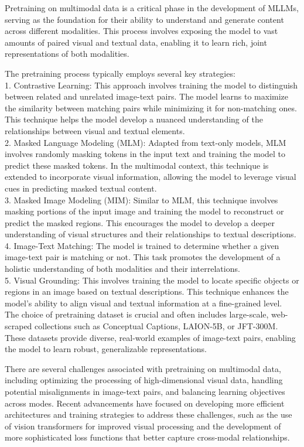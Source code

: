 Pretraining on multimodal data is a critical phase in the development of MLLMs, serving as the foundation for their ability to understand and generate content across different modalities. This process involves exposing the model to vast amounts of paired visual and textual data, enabling it to learn rich, joint representations of both modalities.

The pretraining process typically employs several key strategies:
\\
1. Contrastive Learning: This approach involves training the model to distinguish between related and unrelated image-text pairs. The model learns to maximize the similarity between matching pairs while minimizing it for non-matching ones. This technique helps the model develop a nuanced understanding of the relationships between visual and textual elements.
\\
2. Masked Language Modeling (MLM): Adapted from text-only models, MLM involves randomly masking tokens in the input text and training the model to predict these masked tokens. In the multimodal context, this technique is extended to incorporate visual information, allowing the model to leverage visual cues in predicting masked textual content.
\\
3. Masked Image Modeling (MIM): Similar to MLM, this technique involves masking portions of the input image and training the model to reconstruct or predict the masked regions. This encourages the model to develop a deeper understanding of visual structures and their relationships to textual descriptions.
\\
4. Image-Text Matching: The model is trained to determine whether a given image-text pair is matching or not. This task promotes the development of a holistic understanding of both modalities and their interrelations.
\\
5. Visual Grounding: This involves training the model to locate specific objects or regions in an image based on textual descriptions. This technique enhances the model's ability to align visual and textual information at a fine-grained level.
\\
The choice of pretraining dataset is crucial and often includes large-scale, web-scraped collections such as Conceptual Captions, LAION-5B, or JFT-300M. These datasets provide diverse, real-world examples of image-text pairs, enabling the model to learn robust, generalizable representations.

There are several challenges associated with pretraining on multimodal data, including optimizing the processing of high-dimensional visual data, handling potential misalignments in image-text pairs, and balancing learning objectives across modes. Recent advancements have focused on developing more efficient architectures and training strategies to address these challenges, such as the use of vision transformers for improved visual processing and the development of more sophisticated loss functions that better capture cross-modal relationships.

